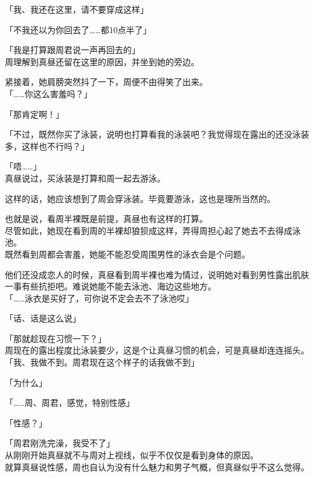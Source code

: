 「我、我还在这里，请不要穿成这样」

「不我还以为你回去了……都10点半了」

「我是打算跟周君说一声再回去的」\\

周理解到真昼还留在这里的原因，并坐到她的旁边。

紧接着，她肩膀突然抖了一下，周便不由得笑了出来。\\

「……你这么害羞吗？」

「那肯定啊！」

「不过，既然你买了泳装，说明也打算看我的泳装吧？我觉得现在露出的还没泳装多，这样也不行吗？」

「唔……」\\

真昼说过，买泳装是打算和周一起去游泳。

这样的话，她应该想到了周会穿泳装。毕竟要游泳，这也是理所当然的。

也就是说，看周半裸既是前提，真昼也有这样的打算。\\

尽管如此，她现在看到周的半裸却狼狈成这样，弄得周担心起了她去不去得成泳池。\\

既然看到周都会害羞，她能不能忍受周围男性的泳衣会是个问题。

他们还没成恋人的时候，真昼看到周半裸也难为情过，说明她对看到男性露出肌肤一事有些抗拒吧。难说她能不能去泳池、海边这些地方。\\

「……泳衣是买好了，可你说不定会去不了泳池哎」

「话、话是这么说」

「那就趁现在习惯一下？」\\

周现在的露出程度比泳装要少，这是个让真昼习惯的机会，可是真昼却连连摇头。\\

「我、我做不到。周君现在这个样子的话我做不到」

「为什么」

「……周、周君，感觉，特别性感」

「性感？」

「周君刚洗完澡，我受不了」\\

从刚刚开始真昼就不与周对上视线，似乎不仅仅是看到身体的原因。\\

就算真昼说性感，周也自认为没有什么魅力和男子气概，但真昼似乎不这么觉得。

